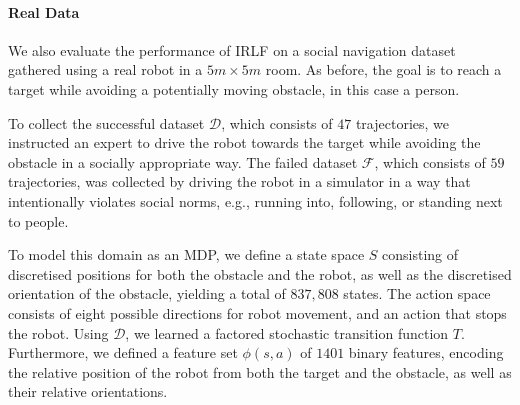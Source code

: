 \documentclass{aamas2016}
\newcommand{\jm}[1]{\textcolor{blue}{Joao: #1}}
\newcommand{\jm}[1]{}
\begin{document}



\paragraph{Real Data}
We also evaluate the performance of IRLF on a social navigation dataset gathered using a real robot in a $5m \times 5m$ room.  As before, the goal is to reach a target while avoiding a potentially moving obstacle, in this case a person. 

To collect the successful dataset $\mathcal{D}$, which consists of $47$ trajectories, we instructed an expert to drive the robot towards the target while avoiding the obstacle in a socially appropriate way. The failed dataset $\mathcal{F}$, which consists of $59$ trajectories, was collected by driving the robot in a simulator in a way that intentionally violates social norms, e.g., running into, following, or standing next to people.


To model this domain as an MDP, we define a state space $S$ consisting of discretised positions for both the obstacle and the robot, as well as the discretised orientation of the obstacle, yielding a total of $837,808$ states. The action space consists of eight possible directions for robot movement, and an action that stops the robot. Using $\mathcal{D}$, we learned a factored stochastic transition function $T$. Furthermore, we defined a feature set $\phi(s,a)$ of $1401$ binary features, encoding the relative position of the robot from both the target and the obstacle, as well as their relative orientations. 
\end{document}
